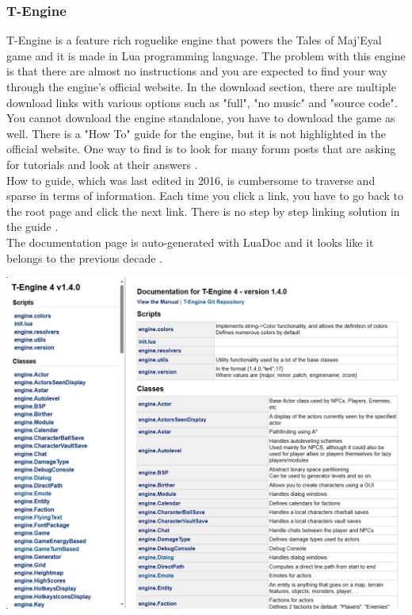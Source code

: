 \documentclass{article}
\begin{document}
\subsubsection{T-Engine}
T-Engine is a feature rich roguelike engine that powers the Tales of Maj'Eyal game and it is made in Lua programming language. The problem with this engine is that there are almost no instructions and you are expected to find your way through the engine's official website. In the download section, there are multiple download links with various options such as "full", "no music" and "source code". You cannot download the engine standalone, you have to download the game as well. There is a "How To" guide for the engine, but it is not highlighted in the official website. One way to find is to look for many forum posts that are asking for tutorials and look at their answers \cite{tengine-q2}\cite{tengine-q3}\cite{tengine-q}.\\

How to guide, which was last edited in 2016, is cumbersome to traverse and sparse in terms of information. Each time you click a link, you have to go back to the root page and click the next link. There is no step by step linking solution in the guide \cite{tengine-howto}.\\

The documentation page is auto-generated with LuaDoc and it looks like it belongs to the previous decade \cite{tengine-docs}.\\

\begin{minipage}{\linewidth}
    \centering
    \includegraphics[width=1\textwidth]{tengine-docs.PNG}
\end{minipage}\\\\
\end{document}
